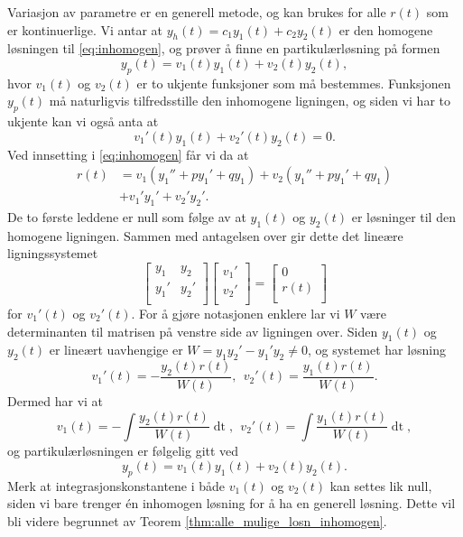 \documentclass{article}
\theoremstyle{definition}
\theoremstyle{remark}
\begin{document}
\begin{multicols*}{2}
Variasjon av parametre er en generell metode, og kan brukes for alle $r(t)$ som er kontinuerlige. Vi antar at $y_h(t) = c_1 y_1(t) + c_2 y_2(t)$ er den homogene løsningen til \eqref{eq:inhomogen}, og prøver å finne en partikulærløsning på formen
\begin{equation*}
  y_p(t) = v_1(t) y_1(t) + v_2(t) y_2(t),
\end{equation*}
hvor $v_1(t)$ og $v_2(t)$ er to ukjente funksjoner som må bestemmes. Funksjonen $y_p(t)$ må naturligvis tilfredsstille den inhomogene ligningen, og siden vi har to ukjente kan vi også anta at
\begin{equation*}
  v_1'(t) y_1(t) + v_2'(t) y_2(t) = 0.
\end{equation*}
Ved innsetting i \eqref{eq:inhomogen} får vi da at
\begin{equation*}
  \begin{split}
    r(t) & = v_1 (y_1'' + p y_1' + q y_1) + v_2 (y_1'' + p y_1' + q y_1) \\
    & + v_1' y_1' + v_2' y_2'.
  \end{split}
\end{equation*}
De to første leddene er null som følge av at $y_1(t)$ og $y_2(t)$ er løsninger til den homogene ligningen. Sammen med antagelsen over gir dette det lineære ligningssystemet
\begin{equation*}
  \begin{bmatrix}
    y_1 & y_2 \\
    y_1' & y_2' \\
  \end{bmatrix}
  \begin{bmatrix}
    v_1' \\
    v_2' \\
  \end{bmatrix}
  =
  \begin{bmatrix}
    0 \\
    r(t) \\
  \end{bmatrix}
\end{equation*}
for $v_1'(t)$ og $v_2'(t)$. For å gjøre notasjonen enklere lar vi $W$ være determinanten til matrisen på venstre side av ligningen over. Siden $y_1(t)$ og $y_2(t)$ er lineært uavhengige er $W = y_1 y_2' - y_1' y_2 \neq 0$, og systemet har løsning
\begin{equation*}
  v_1'(t) = -\frac{y_2(t) r(t)}{W(t)}, \ \ v_2'(t) = \frac{y_1(t) r(t)}{W(t)}.
\end{equation*}
Dermed har vi at
\begin{equation*}
  v_1(t) = -\int \frac{y_2(t) r(t)}{W(t)} \mathop{dt}, \ \ v_2'(t) = \int \frac{y_1(t) r(t)}{W(t)} \mathop{dt},
\end{equation*}
og partikulærløsningen er følgelig gitt ved
\begin{equation*}
  y_p(t) = v_1(t) y_1(t) + v_2(t) y_2(t).
\end{equation*}
Merk at integrasjonskonstantene i både $v_1(t)$ og $v_2(t)$ kan settes lik null, siden vi bare trenger én inhomogen løsning for å ha en generell løsning. Dette vil bli videre begrunnet av Teorem \ref{thm:alle_mulige_losn_inhomogen}.


\end{multicols*}
\end{document}
